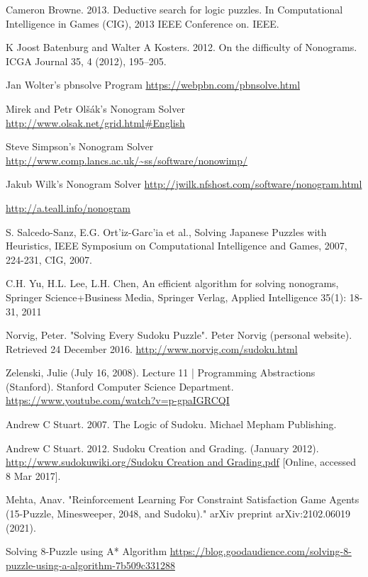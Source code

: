 \documentclass{svproc}
\begin{document}
\begin{thebibliography}{6}

Cameron Browne. 2013. Deductive search for logic puzzles. In Computational
Intelligence in Games (CIG), 2013 IEEE Conference on. IEEE.

K Joost Batenburg and Walter A Kosters. 2012. On the difficulty of Nonograms.
ICGA Journal 35, 4 (2012), 195–205.

Jan Wolter's pbnsolve Program
\url{https://webpbn.com/pbnsolve.html}

Mirek and Petr Olšák's Nonogram Solver
\url{http://www.olsak.net/grid.html#English}

Steve Simpson's Nonogram Solver
\url{http://www.comp.lancs.ac.uk/~ss/software/nonowimp/}

Jakub Wilk's Nonogram Solver
\url{http://jwilk.nfshost.com/software/nonogram.html}

\url{http://a.teall.info/nonogram}

S. Salcedo-Sanz, E.G. Ort’iz-Garc’ia et al., Solving Japanese Puzzles with
Heuristics, IEEE Symposium on Computational Intelligence and Games,
2007, 224-231, CIG, 2007.

C.H. Yu, H.L. Lee, L.H. Chen, An efficient algorithm for solving nonograms, Springer Science+Business Media, Springer Verlag, Applied Intelligence 35(1): 18-31, 2011

Norvig, Peter. "Solving Every Sudoku Puzzle". Peter Norvig (personal website). Retrieved 24 December 2016.
\url{http://www.norvig.com/sudoku.html}

Zelenski, Julie (July 16, 2008). Lecture 11 | Programming Abstractions (Stanford). Stanford Computer Science Department.
\url{https://www.youtube.com/watch?v=p-gpaIGRCQI}

Andrew C Stuart. 2007. The Logic of Sudoku. Michael Mepham Publishing.

Andrew C Stuart. 2012. Sudoku Creation and Grading. (January 2012).
\url{http://www.sudokuwiki.org/Sudoku Creation and Grading.pdf}
[Online, accessed 8 Mar 2017].

Mehta, Anav. "Reinforcement Learning For Constraint Satisfaction Game Agents (15-Puzzle, Minesweeper, 2048, and Sudoku)." arXiv preprint arXiv:2102.06019 (2021).

Solving 8-Puzzle using A* Algorithm
\url{https://blog.goodaudience.com/solving-8-puzzle-using-a-algorithm-7b509c331288}


\end{thebibliography}
\end{document}
